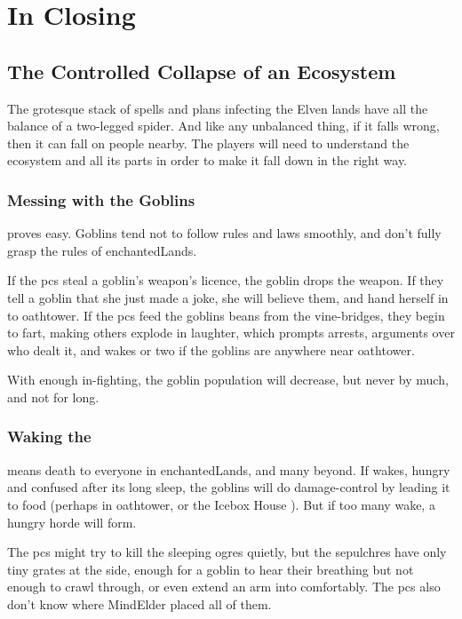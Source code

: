 \section{In Closing}
\label{feyClosing}

\begin{multicols}{2}

\subsection{The Controlled Collapse of an Ecosystem}

The grotesque stack of \glspl{spell} and plans infecting the Elven lands have all the balance of a two-legged spider.
And like any unbalanced thing, if it falls wrong, then it can fall on people nearby.
The players will need to understand the ecosystem and all its parts in order to make it fall down in the right way.

\subsubsection{Messing with the Goblins}
proves easy.
Goblins tend not to follow rules and laws smoothly,%
and don't fully grasp the rules of \gls{enchantedLands}.

If the \glspl{pc} steal a goblin's weapon's licence, the goblin drops the weapon.
If they tell a goblin that she just made a joke, she will believe them, and hand herself in to \gls{oathtower}.
If the \glspl{pc} feed the goblins beans from the vine-bridges,
they begin to fart, making others explode in laughter, which prompts arrests, arguments over who dealt it, and wakes  or two if the goblins are anywhere near \gls{oathtower}.

With enough in-fighting, the goblin population will decrease, but never by much, and not for long.

\subsubsection{Waking the }
means death to everyone in \gls{enchantedLands}, and many beyond.
If  wakes, hungry and confused after its long sleep, the goblins will do damage-control by leading it to food (perhaps in \gls{oathtower}, or the Icebox House ).
But if too many wake, a hungry horde will form.

The \glspl{pc} might try to kill the sleeping \glspl{ogre} quietly, but the \glspl{sepulchre} have only tiny grates at the side, enough for a goblin to hear their breathing but not enough to crawl through, or even extend an arm into comfortably.
The \glspl{pc} also don't know where \gls{MindElder} placed all of them.


\end{multicols}
